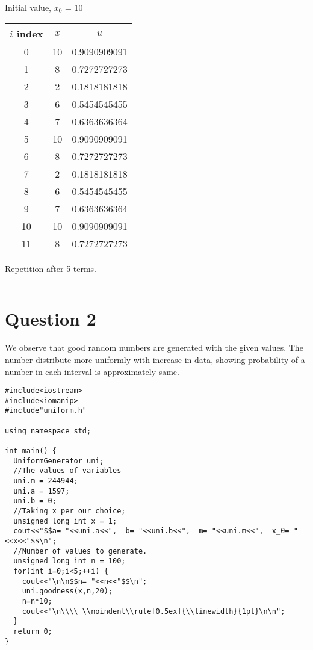 \documentclass{article}
\begin{document}
Initial value, $x_0$ = 10
\begin{center} \begin{tabular}{||c | c | c||}  \hline
		$i$ index & $x$ & $u$ \\ [0.5ex] \hline \hline0 & 10 & 0.9090909091\\
		\hline 
		1 & 8 & 0.7272727273\\
		\hline 
		2 & 2 & 0.1818181818\\
		\hline 
		3 & 6 & 0.5454545455\\
		\hline 
		4 & 7 & 0.6363636364\\
		\hline 
		5 & 10 & 0.9090909091\\
		\hline 
		6 & 8 & 0.7272727273\\
		\hline 
		7 & 2 & 0.1818181818\\
		\hline 
		8 & 6 & 0.5454545455\\
		\hline 
		9 & 7 & 0.6363636364\\
		\hline 
		10 & 10 & 0.9090909091\\
		\hline 
		11 & 8 & 0.7272727273\\
		\hline 
	\end{tabular} 
\end{center} Repetition after 5 terms.
\\ \noindent\rule[0.5ex]{\linewidth}{1pt}
\pagebreak

\section{Question 2}
We observe that good random numbers are generated with the given values. The number distribute more uniformly with increase in data, showing probability of a number in each interval is approximately same.


\begin{lstlisting}
#include<iostream>
#include<iomanip>
#include"uniform.h"

using namespace std;

int main() {
  UniformGenerator uni;
  //The values of variables
  uni.m = 244944;
  uni.a = 1597;
  uni.b = 0;
  //Taking x per our choice;
  unsigned long int x = 1;
  cout<<"$$a= "<<uni.a<<",  b= "<<uni.b<<",  m= "<<uni.m<<",  x_0= "<<x<<"$$\n";
  //Number of values to generate.
  unsigned long int n = 100;
  for(int i=0;i<5;++i) {
    cout<<"\n\n$$n= "<<n<<"$$\n";
    uni.goodness(x,n,20);
    n=n*10;
    cout<<"\n\\\\ \\noindent\\rule[0.5ex]{\\linewidth}{1pt}\n\n";
  }
  return 0;
}

\end{lstlisting}
\end{document}

